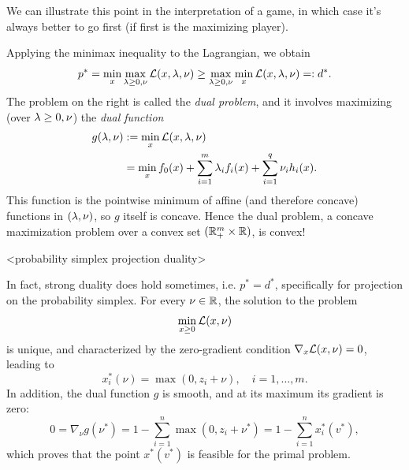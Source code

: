 \documentclass[11 pt]{scrartcl}
\begin{document}
We can illustrate this point in the interpretation of a game, in which case it's always better to go first (if first is the maximizing player). 

Applying the minimax inequality to the Lagrangian, we obtain 
\[ p^*  = \min_x \max_{\lambda\geq 0, \nu} \mathcal L(x,\lambda, \nu) \geq \max_{\lambda\geq 0,\nu} \min_x \mathcal L(x,\lambda,\nu) =: d^*.\] 
The problem on the right is called the \emph{dual problem}, and it involves maximizing (over $\lambda\geq 0, \nu$) the \emph{dual function} 
\begin{align*}
    g(\lambda,\nu) &:= \min_x  \mathcal L(x,\lambda,\nu) \\ 
               &= \min_x f_0(x) + \sum_{i=1}^m \lambda_i f_i(x) + \sum_{i=1}^q \nu_i h_i(x).
\end{align*}
This function is the pointwise minimum of affine (and therefore concave) functions in $(\lambda, \nu)$, so $g$ itself is concave. 
Hence the dual problem, a concave maximization problem over a convex set $(\mathbb R^m_+ \times \mathbb R)$, is convex!

<probability simplex projection duality>

In fact, strong duality does hold sometimes, i.e. $p^* = d^*$, specifically for projection on the probability simplex.
For every $\nu\in \mathbb R$, the solution to the problem 
\[ \min_{x\geq 0} \mathcal L(x,\nu)\] 
is unique, and characterized by the zero-gradient condition $\nabla_x \mathcal L(x,\nu) = 0$, leading to 
\[ x_i^*(\nu) = \max(0, z_i + \nu), \quad i = 1,\dots, m.\] 
In addition, the dual function $g$ is smooth, and at its maximum its gradient is zero: 
\[ 0 = \nabla_\nu g(\nu^*) = 1 - \sum_{i=1}^n \max(0, z_i + \nu^*) = 1 - \sum_{i=1}^n x_i^* (v^*),\] 
which proves that the point $x^* (v^*)$ is feasible for the primal problem. 
\end{document}
